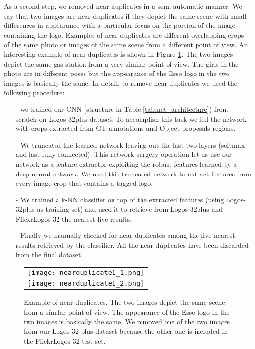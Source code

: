 \documentclass[final,5p,twocolumn]{elsarticle}
\begin{document}
As a second step, we removed near duplicates in a semi-automatic manner. We say that two images are near duplicates if they depict the same scene with small differences in appearance with a particular focus on the portion of the image containing the logo. Examples of near duplicates are different overlapping crops of the same photo or images of the same scene from a different point of view. An interesting example of near duplicates is shown in Figure \ref{fig:nearduplicates}. The two images depict the same gas station from a very similar point of view. The girls in the photo are in different poses but the appearance of the Esso logo in the two images is basically the same. In detail, to remove near duplicates we used the following procedure:
\begin{itemize}
\item[-] we trained our CNN (structure in Table \ref{tab:net_architecture}) from scratch on Logos-32plus dataset. To accomplish this task we fed the network with crops extracted from GT annotations and Object-proposals regions.
\item[-] We truncated the learned network leaving out the last two layers (softmax and last fully-connected). This network surgery operation let us use our network as a feature extractor exploiting the robust features learned by a deep neural network. We used this truncated network to extract features from every image crop that contains a tagged logo.
\item[-] We trained a k-NN classifier on top of the extracted features (using Logos-32plus as training set) and used it to retrieve from Logos-32plus and FlickrLogos-32 the nearest five results.
\item[-] Finally we manually checked for near duplicates among the five nearest results retrieved by the classifier. All the near duplicates have been discarded from the final dataset.
\end{itemize}



\begin{figure}[!h]
\centering
\begin{tabular}{c}
	\texttt{[image: nearduplicate1\_1.png]} \\
	\texttt{[image: nearduplicate1\_2.png]}\\
\end{tabular}

	\caption{Example of near duplicates. The two images depict the same scene from a similar point of view. The appearance of the Esso logo in the two images is basically the same. We removed one of the two images from our Logos-32 plus dataset because the other one is included in the FlickrLogos-32 test set.}
	\label{fig:nearduplicates}
\end{figure}
\end{document}
